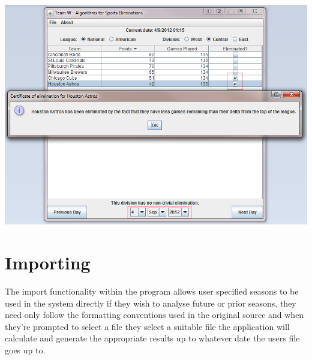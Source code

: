\includegraphics[width=\linewidth,keepaspectratio]{images/userManualDesk6.png}

\section{Importing}

The import functionality within the program allows user specified seasons to be used in the system directly if they wish to analyse future or prior seasons, they need only follow the formatting conventions used in the original source and when they're prompted to select a file they select a suitable file the application will calculate and generate the appropriate results up to whatever date the users file goes up to.

